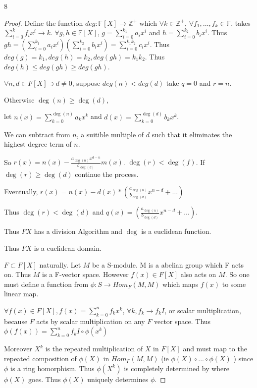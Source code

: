 \documentclass{article}
\newcommand{\Z}{\mathbb{Z}}
\newcommand{\F}{\mathbb{F}}
\begin{document}
\bigskip

\begin{PROB}{8}\label{Problem 8.}
\end{PROB}
\begin{proof}
    Define the function $deg: \F[X] \to \Z^+$ which $\forall k \in \Z^+$, $\forall f_1, \dots, f_k \in \F$, takes $\sum_{i = 0}^k f_i x^i \to k$. $\forall g, h \in \F[X]$, $g = \sum_{i = 0}^{k_1}a_i x^i$ and $h = \sum_{i = 0}^{k_2} b_i x^i$. Thus $gh = \left(\sum_{i = 0}^{k_1} a_i x^i\right)\left(\sum_{i = 0}^{k_2} b_i x^i\right) = \sum_{i = 0}^{k_1k_2} c_i x^i$. Thus $deg(g) = k_1, deg(h) = k_2, deg(gh) = k_1k_2$. Thus $deg(h) \leq deg(gh) \geq deg(gh)$.
    
    $\forall n, d \in F[X] \ni d \neq 0$, suppose $deg(n) < deg(d)$ take $q = 0$ and $r = n$.
    
    Otherwise $\deg(n) \geq \deg(d)$, 
    
    let $n(x) = \sum_{k = 0}^{\deg(n)} a_k x^k$ and $d(x) = \sum_{k = 0}^{\deg(d)} b_k x^k$. 
    
    We can subtract from $n$, a suitible multiple of $d$ such that it eliminates the highest degree term of $n$. 
    
    So $r(x) = n(x) - \frac{a_{\deg(n)} x^{d - n}}{b_{\deg(d)}} m(x)$. $\deg(r) < \deg(f)$. If $\deg(r) \geq \deg(d)$ continue the process. 
    
    Eventually, $r(x) = n(x) - d(x) * \left(\frac{a_{\deg(n)}}{b_{\deg(d)}} x^{n - d} + \dots \right)$
    
    Thus $\deg(r) < \deg(d)$ and $q(x) = \left(\frac{a_{\deg(n)}}{b_{\deg(d)}} x^{n - d} + \dots \right)$. 

    Thus $F{X}$ has a division Algorithm and $\deg$ is a euclidean function.  
    
    Thus $F{X}$ is a euclidean domain.  


    $F \subset F[X]$ naturally. Let $M$ be a S-module. M is a abelian group which F acts on. Thus $M$ is a F-vector space. However $f(x) \in F[X]$ also acts on $M$. So one must define a function from $\phi: S \to Hom_{F}(M, M)$ which maps $f(x)$ to some linear map. 
    
    $\forall f(x) \in F[X], f(x) = \sum_{k = 0}^{n}f_{k}x^k$, $\forall k, f_{k} \to f_{k}I$, or scalar multiplication, because $F$ acts by scalar multiplication on any $F$ vector space. Thus $\phi(f(x)) = \sum_{k = 0}^{n}f_{k}I \circ \phi(x^k)$ 
    
    Moreover $X^k$ is the repeated multiplication of $X$ in $F[X]$ and must map to the repeated composition of $\phi(X)$ in $Hom_F(M, M)$ (ie $\phi(X) \circ ... \circ \phi(X)$ ) since $\phi$ is a ring homorphism. Thus $\phi(X^k)$ is completely determined by where $\phi(X)$ goes. Thus $\phi(X) $ uniquely determines $\phi$.  


\end{proof}
\end{document}
